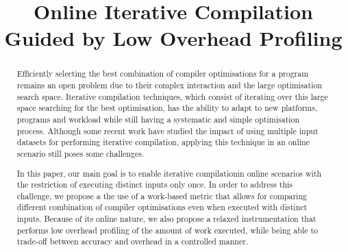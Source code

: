 \documentclass[sigplan,10pt]{acmart}
\newcommand{\itercomp}{{iterative compilation}}
\newcommand{\Itercomp}{{Iterative compilation}}
\newcommand{\IterComp}{{Iterative Compilation}}
\begin{document}
\title{Online {\IterComp}\\Guided by Low Overhead Profiling}

\author{ }
\affiliation{%
  \institution{ }
}
\email{ }







\renewcommand{\shortauthors}{R. Rocha et al.}

\begin{abstract}
Efficiently selecting the best combination of compiler optimisations for a program
remains an open problem due to their complex interaction and the large optimisation search space.
{\Itercomp} techniques, which consist of iterating
over this large space searching for the best optimisation,
has the ability to adapt to new platforms, programs and workload while still
having a systematic and simple optimisation process.
Although some recent work have studied the impact of using multiple
input datasets for performing \itercomp, applying this
technique in an online scenario still poses some challenges.

In this paper, our main goal is to enable \itercomp in
online scenarios with the restriction of executing distinct inputs
only once.
In order to address this challenge,
we propose a the use of a work-based metric that allows for comparing different
combination of compiler optimisations even when executed with distinct inputs.
Because of its online nature, we also propose a relaxed instrumentation
that performs low overhead profiling of the amount of work executed, while
being able to trade-off between accuracy and overhead in a controlled manner.
\end{abstract}
\end{document}

